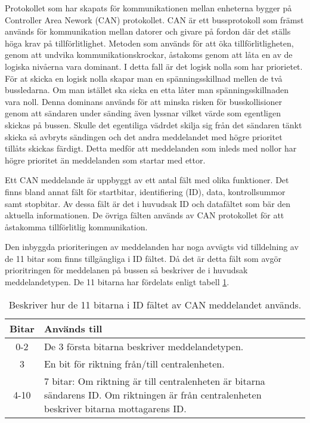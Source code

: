 Protokollet som har skapats för kommunikationen mellan enheterna bygger på Controller Area Nework (CAN) protokollet.
CAN är ett bussprotokoll som främst används för kommunikation mellan datorer och givare på fordon där det ställs höga krav på tillförlitlighet. Metoden som används för att öka tillförlitligheten, genom att undvika kommunikationskrockar, åstakoms genom att låta en av de logiska nivåerna vara dominant. I detta fall är det logisk nolla som har priorietet.
För at skicka en logisk nolla skapar man en spänningsskillnad mellen de två bussledarna.
Om man istället ska sicka en etta låter man spänningsskillnaden vara noll.
Denna dominans används för att minska risken för busskollisioner genom att sändaren under sänding även lyssnar vilket värde som egentligen skickas på bussen.
Skulle det egentiliga vädrdet skilja sig från det sändaren tänkt skicka så avbryts sändingen och det andra meddelandet med högre prioritet tillåts skickas färdigt.
Detta medför att meddelanden som inleds med nollor har högre prioritet än meddelanden som startar med ettor.

Ett CAN meddelande är uppbyggt av ett antal fält med olika funktioner. Det finns bland annat fält för startbitar, identifiering (ID), data, kontrollsummor samt stopbitar.
Av dessa fält är det i huvudsak ID och datafältet som bär den aktuella informationen.
De övriga fälten används av CAN protokollet för att åstakomma tillförlitlig kommunikation.

Den inbyggda prioriteringen av meddelanden har noga avvägts vid tilldelning av de 11 bitar som finns tillgängliga i ID fältet.
Då det är detta fält som avgör prioritringen för meddelanen på bussen så beskriver de i huvudsak meddelandetypen.
De 11 bitarna har fördelats enligt tabell \ref{tab:idbitar}.

\begin{table}[H]
	\centering
	\begin{tabular}{|c|p{}|}
		\hline
		Bitar 	& Används till \\ \hline \hline
		0-2		& De 3 första bitarna beskriver meddelandetypen. \\ \hline
		3		& En bit för riktning från/till centralenheten. \\ \hline
		4-10	& 7 bitar:
		Om riktning är till centralenheten är bitarna sändarens ID.
		Om riktningen är från centralenheten beskriver bitarna mottagarens ID. \\ \hline

	\end{tabular}
	\caption{Beskriver hur de 11 bitarna i ID fältet av CAN meddelandet används.}
	\label{tab:idbitar}
\end{table}


